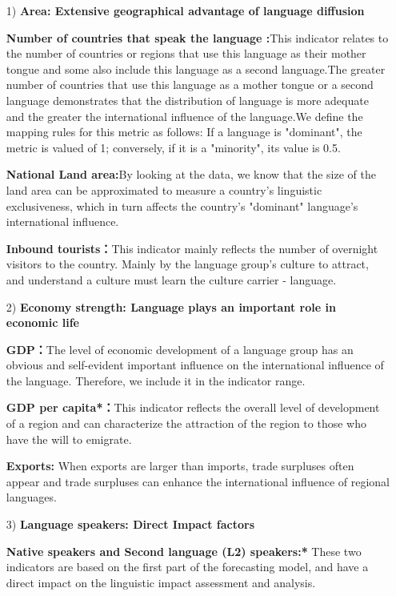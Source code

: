 \begin{enumerate}
	\item[1)] \textbf{Area: Extensive geographical advantage of language diffusion}
	\par \textbf{Number of countries that speak the language :}This indicator relates to the number of countries or regions that use this language as their mother tongue and some also include this language as a second language.The greater number of countries that use this language as a mother tongue or a second language demonstrates that the distribution of language is more adequate and the greater the international influence of the language.We define the mapping rules for this metric as follows: If a language is "dominant", the metric is valued of 1; conversely, if it is a "minority", its value is 0.5.
	\par \textbf{National Land area:}By looking at the data, we know that the size of the land area can be approximated to measure a country's linguistic exclusiveness, which in turn affects the country's "dominant" language's international influence.
	\par \textbf{Inbound tourists：}This indicator mainly reflects the number of overnight visitors to the country. Mainly by the language group's culture to attract, and understand a culture must learn the culture carrier - language.
	
	\item[2)] \textbf{Economy strength: Language plays an important role in economic life}
	\par \textbf{GDP：}The level of economic development of a language group has an obvious and self-evident important influence on the international influence of the language. Therefore, we include it in the indicator range.
	\par \textbf{GDP per capita*：}This indicator reflects the overall level of development of a region and can characterize the attraction of the region to those who have the will to emigrate.
	\par \textbf{Exports: }When exports are larger than imports, trade surpluses often appear and trade surpluses can enhance the international influence of regional languages.
	
	\item[3)] \textbf{Language speakers: Direct Impact factors}
	\par \textbf{Native speakers and Second language (L2) speakers:*} These two indicators are based on the first part of the forecasting model, and have a direct impact on the linguistic impact assessment and analysis.
	

\end{enumerate}

